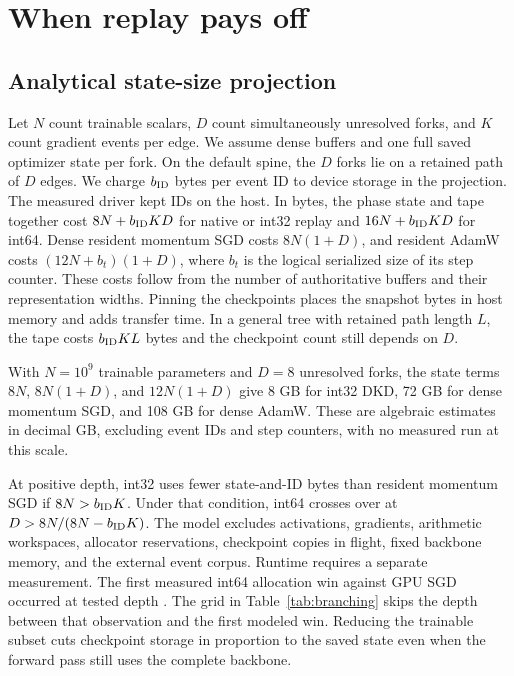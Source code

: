 \section{When replay pays off}
\label{sec:discussion}

\subsection{Analytical state-size projection}

Let \(N\) count trainable scalars, \(D\) count simultaneously
unresolved forks, and \(K\) count gradient events per edge. We
assume dense buffers and one full saved optimizer state per
fork. On the default spine, the \(D\) forks lie on a retained
path of \(D\) edges. We charge \(b_{\rm ID}\) bytes per event ID
to device storage in the projection. The measured driver kept
IDs on the host. In bytes, the phase state and tape together
cost \(8N+b_{\rm ID}KD\) for native or int32 replay and
\(16N+b_{\rm ID}KD\) for int64. Dense resident momentum SGD
costs \(8N(1+D)\), and resident AdamW costs \((12N+b_t)(1+D)\),
where \(b_t\) is the logical serialized size of its step counter.
These costs follow from the number of authoritative buffers and
their representation widths. Pinning the checkpoints places
the snapshot bytes in host memory and adds transfer time. In a
general tree with retained path length \(L\), the tape costs
\(b_{\rm ID}KL\) bytes and the checkpoint count still depends on \(D\).

With \(N=10^9\) trainable parameters and \(D=8\) unresolved
forks, the state terms \(8N\), \(8N(1+D)\), and \(12N(1+D)\)
give 8 GB for int32 DKD, 72 GB for dense momentum SGD, and 108 GB
for dense AdamW. These are algebraic estimates in decimal GB,
excluding event IDs and step counters, with no measured run at
this scale.

At positive depth, int32 uses fewer state-and-ID bytes than
resident momentum SGD if \(8N>b_{\rm ID}K\). Under that condition,
int64 crosses over at \(D>8N/(8N-b_{\rm ID}K)\). The model
excludes activations, gradients, arithmetic workspaces, allocator
reservations, checkpoint copies in flight, fixed backbone memory,
and the external event corpus. Runtime requires a separate measurement.
The first measured int64 allocation win against GPU SGD occurred
at tested depth \PthreeIntHighFirstSgdWin{}. The grid in
Table~\ref{tab:branching} skips the depth between that observation
and the first modeled win. Reducing the trainable subset cuts
checkpoint storage in proportion to the saved state even when
the forward pass still uses the complete backbone.

